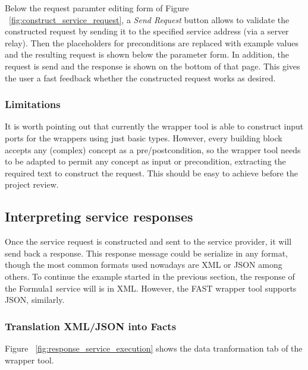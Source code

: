 \documentclass{article}
\begin{document}
Below the request paramter editing form of Figure ~\ref{fig:construct_service_request}, a \textit{Send Request} button allows to validate the constructed request by sending it to the specified service address (via a server relay). Then the placeholders for preconditions are replaced with example values and the resulting request is shown below the parameter form. In addition, the request is send and the response is shown on the bottom of that page. This gives the user a fast feedback whether the constructed request works as desired. 

\subsubsection{Limitations} %
\label{ssub:limitations}

It is worth pointing out that currently the wrapper tool is able to construct input ports for the wrappers using just basic types. However, every building block accepts any (complex) concept as a pre/postcondition, so the wrapper tool needs to be adapted to permit any concept as input or precondition, extracting the required text to construct the request. This should be easy to achieve before the project review. 



\subsection{Interpreting service responses} %
\label{sub:interpreting_service_responses}

Once the service request is constructed and sent to the service provider, it will send back a response. This response message could be serialize in any format, though the most common formats used nowadays are XML or JSON among others. To continue the example started in the previous section, the response of the Formula1 service will is in XML. However, the FAST wrapper tool supports JSON, similarly.

\subsubsection{Translation XML/JSON into Facts} %
\label{ssub:translation_xml_into_facts}

Figure ~\ref{fig:response_service_execution} shows the data tranformation tab of the wrapper tool. 
\end{document}
